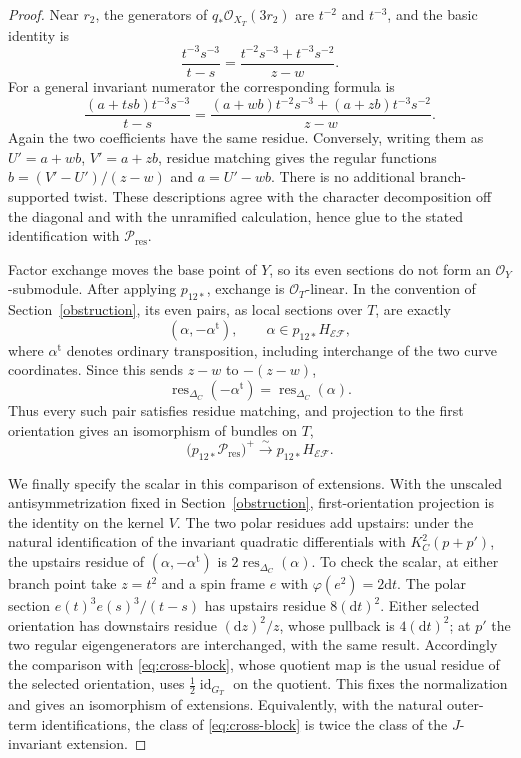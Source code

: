 \documentclass[11pt,a4paper,dvipsnames]{amsart}
\numberwithin{equation}{section}
\theoremstyle{plain}
\theoremstyle{definition}
\newcommand{\cO}{\mathcal O}
\newcommand{\cE}{\mathcal E}
\newcommand{\cF}{\mathcal F}
\newcommand{\id}{\operatorname{id}}
\newcommand{\dd}{\mathrm d}
\begin{document}
\begin{proof}
Near $r_2$, the generators of $q_*\cO_{X_T}(3r_2)$ are $t^{-2}$ and
$t^{-3}$, and the basic identity is
\begin{equation}\label{eq:local-pole-r2}
 \frac{t^{-3}s^{-3}}{t-s}
 =\frac{t^{-2}s^{-3}+t^{-3}s^{-2}}{z-w}.
\end{equation}
For a general invariant numerator the corresponding formula is
$$
 \frac{(a+tsb)t^{-3}s^{-3}}{t-s}
 =\frac{(a+wb)t^{-2}s^{-3}+(a+zb)t^{-3}s^{-2}}{z-w}.
$$
Again the two coefficients have the same residue.  Conversely, writing
them as $U'=a+wb$, $V'=a+zb$, residue matching gives the regular functions
$b=(V'-U')/(z-w)$ and $a=U'-wb$.
There is no additional branch-supported twist.  These descriptions
agree with the character decomposition off the diagonal and with the
unramified calculation, hence glue to the stated identification with
$\mathscr P_{\mathrm{res}}$.

Factor exchange moves the base point of $Y$, so its even sections do not
form an $\cO_Y$-submodule.  After applying $p_{12*}$, exchange is
$\cO_T$-linear.  In the convention of Section~\ref{obstruction}, its
even pairs, as local sections over $T$, are exactly
$$
 (\alpha,-\alpha^{\mathrm t}),
 \qquad \alpha\in p_{12*}H_{\cE\cF},
$$
where $\alpha^{\mathrm t}$ denotes ordinary transposition, including
interchange of the two curve coordinates.  Since this sends $z-w$ to
$-(z-w)$,
$$
 \operatorname{res}_{\Delta_C}(-\alpha^{\mathrm t})
 =\operatorname{res}_{\Delta_C}(\alpha).
$$
Thus every such pair satisfies residue matching, and projection to the
first orientation gives an isomorphism of bundles on $T$,
$$
 \bigl(p_{12*}\mathscr P_{\mathrm{res}}\bigr)^+
 \xrightarrow{\sim}p_{12*}H_{\cE\cF}.
$$

We finally specify the scalar in this comparison of extensions.
With the unscaled antisymmetrization fixed in Section~\ref{obstruction},
first-orientation projection is the identity on the kernel $V$.
The two polar residues add upstairs: under the natural identification of
the invariant quadratic differentials with $K_C^2(p+p')$, the upstairs
residue of $(\alpha,-\alpha^{\mathrm t})$ is
$2\operatorname{res}_{\Delta_C}(\alpha)$.
To check the scalar, at either branch point take $z=t^2$ and a spin frame
$e$ with $\varphi(e^2)=2\dd t$.  The polar section
$e(t)^3e(s)^3/(t-s)$ has upstairs residue $8(\dd t)^2$.
Either selected orientation has downstairs residue $(\dd z)^2/z$,
whose pullback is $4(\dd t)^2$; at $p'$ the two regular eigengenerators
are interchanged, with the same result.
Accordingly the comparison with \eqref{eq:cross-block}, whose quotient
map is the usual residue of the selected orientation, uses
$\tfrac12\id_{G_T}$ on the quotient.  This fixes the normalization and
gives an isomorphism of extensions.  Equivalently, with the natural
outer-term identifications, the class of \eqref{eq:cross-block} is twice
the class of the $J$-invariant extension.
\end{proof}
\end{document}
